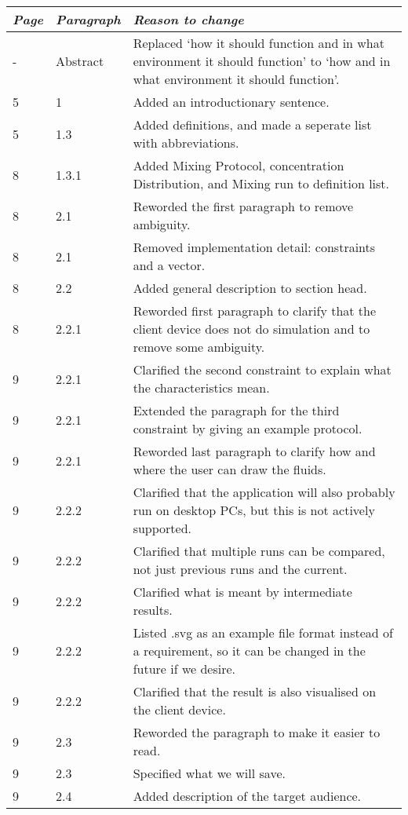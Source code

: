 \begin{longtable}{|l|l|p{11cm}|}
    \hline
    \emph{Page} &   \emph{Paragraph}    &   \emph{Reason to change}\\
    \hline
    \endhead
    \hline
    \endfoot
    - & Abstract & Replaced `how it should function and in what environment it should function' to `how and in what environment it should function'.\\
    5 & 1 & Added an introductionary sentence.\\
    5 & 1.3 & Added definitions, and made a seperate list with abbreviations. \\
    8 & 1.3.1 & Added Mixing Protocol, concentration Distribution, and Mixing run to definition list. \\
    8 & 2.1 & Reworded the first paragraph to remove ambiguity. \\
    8 & 2.1 & Removed implementation detail: constraints and a vector. \\
    8 & 2.2 & Added general description to section head. \\
    8 & 2.2.1 & Reworded first paragraph to clarify that the client device does not do simulation and to remove some ambiguity. \\
    9 & 2.2.1 & Clarified the second constraint to explain what the characteristics mean. \\
    9 & 2.2.1 & Extended the paragraph for the third constraint by giving an example protocol. \\
    9 & 2.2.1 & Reworded last paragraph to clarify how and where the user can draw the fluids. \\
    9 & 2.2.2 & Clarified that the application will also probably run on desktop PCs, but this is not actively supported. \\
    9 & 2.2.2 & Clarified that multiple runs can be compared, not just previous runs and the current.\\
    9 & 2.2.2 & Clarified what is meant by intermediate results. \\
    9 & 2.2.2 & Listed .svg as an example file format instead of a requirement, so it can be changed in the future if we desire. \\
    9 & 2.2.2 & Clarified that the result is also visualised on the client device. \\
    9 & 2.3 & Reworded the paragraph to make it easier to read. \\
    9 & 2.3 & Specified what we will save. \\
    9 & 2.4 & Added description of the target audience. \\

\end{longtable}
